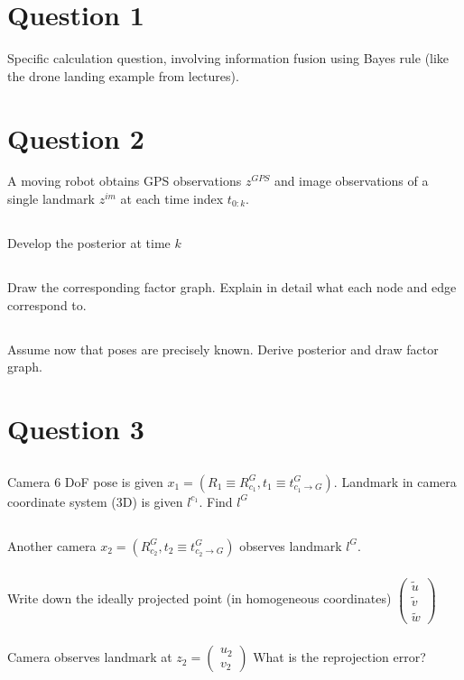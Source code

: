 \documentclass[a4paper]{scrreprt}
\begin{document}
\chapter{Question 1}
Specific calculation question, involving information fusion using Bayes rule 
(like the drone landing example from lectures).

\chapter{Question 2}
A moving robot obtains GPS observations $z^{GPS}$ and image observations of a 
single landmark $z^{im}$ at each time index $t_{0:k}$. 
\section{}
Develop the posterior at time $k$
\section{}
Draw the corresponding factor graph. Explain in detail what each node and edge 
correspond to. 
\section{}
Assume now that poses are precisely known. Derive posterior and draw factor 
graph. 

\chapter*{Question 3}
\section{}
Camera 6 DoF pose is given $x_1 = (R_1\equiv R_{c_1}^{G}, t_1\equiv t^G_{c_1\to 
G})$. Landmark in camera coordinate system (3D) is given $l^{c_1}$. Find $l^G$

\section{}
Another camera $x_2 = (R_{c_2}^{G}, t_2\equiv t^G_{c_2\to 
G})$ observes landmark $l^G$. 
\subsection{}
Write down the ideally projected point (in homogeneous coordinates) 
$\begin{pmatrix}
\tilde{u} \\ \tilde{v} \\ \tilde{w}
\end{pmatrix}$

\subsection{}
Camera observes landmark at $z_2=\begin{pmatrix}
u_2\\v_2
\end{pmatrix}$ What is the reprojection error? 
\end{document}
